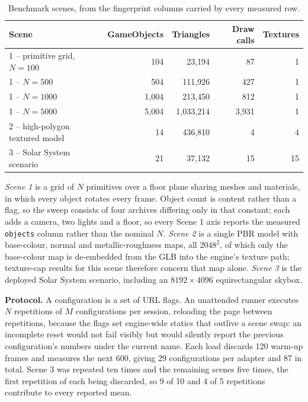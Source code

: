\begin{table}[H]
\centering\small\setlength{\tabcolsep}{4pt}
\caption{Benchmark scenes, from the fingerprint columns carried by every measured row.}
\label{tab:scenes}
\begin{tabular}{lrrrr}
\toprule
Scene & GameObjects & Triangles & Draw calls & Textures \\
\midrule
1 -- primitive grid, $N=100$   & 104   & 23{,}194    & 87    & 1 \\
1 -- $N=500$   & 504   & 111{,}926   & 427   & 1 \\
1 -- $N=1000$  & 1{,}004 & 213{,}450 & 812   & 1 \\
1 -- $N=5000$  & 5{,}004 & 1{,}033{,}214 & 3{,}931 & 1 \\
2 -- high-polygon textured model & 14  & 436{,}810   & 4     & 4 \\
3 -- Solar System scenario     & 21    & 37{,}132    & 15    & 15 \\
\bottomrule
\end{tabular}
\end{table}

\textit{Scene 1} is a grid of $N$ primitives over a floor plane sharing meshes and materials, in which every object rotates every frame. Object count is content rather than a flag, so the sweep consists of four archives differing only in that constant; each adds a camera, two lights and a floor, so every Scene 1 axis reports the measured \texttt{objects} column rather than the nominal $N$. \textit{Scene 2} is a single PBR model with base-colour, normal and metallic-roughness maps, all $2048^2$, of which only the base-colour map is de-embedded from the GLB into the engine's texture path; texture-cap results for this scene therefore concern that map alone. \textit{Scene 3} is the deployed Solar System scenario, including an $8192\times4096$ equirectangular skybox.

\textbf{Protocol.} A configuration is a set of URL flags. An unattended runner executes $N$ repetitions of $M$ configurations per session, reloading the page between repetitions, because the flags set engine-wide statics that outlive a scene swap: an incomplete reset would not fail visibly but would silently report the previous configuration's numbers under the current name. Each load discards 120 warm-up frames and measures the next 600, giving 29 configurations per adapter and 87 in total. Scene 3 was repeated ten times and the remaining scenes five times, the first repetition of each being discarded, so 9 of 10 and 4 of 5 repetitions contribute to every reported mean.


